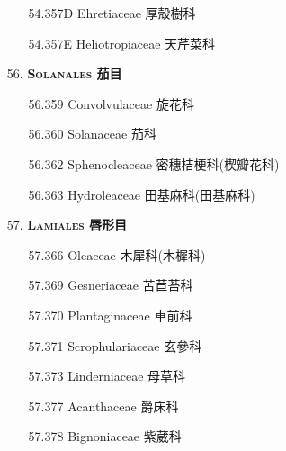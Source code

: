 \begin{enumerate}
\begin{enumerate}
        
      \item[54.357D] Ehretiaceae 厚殼樹科     
        
      \item[54.357E] Heliotropiaceae 天芹菜科     
        
    \end{enumerate}
  \item[56. ] \textbf{\textsc{Solanales} 茄目}   
    \begin{enumerate}
      \item[56.359] Convolvulaceae 旋花科     
        
      \item[56.360] Solanaceae 茄科     
        
      \item[56.362] Sphenocleaceae 密穗桔梗科(楔瓣花科)     
        
      \item[56.363] Hydroleaceae 田基麻科(田基麻科)     
        
    \end{enumerate}
  \item[57. ] \textbf{\textsc{Lamiales} 唇形目}   
    \begin{enumerate}
      \item[57.366] Oleaceae 木犀科(木樨科)     
        
      \item[57.369] Gesneriaceae 苦苣苔科     
        
      \item[57.370] Plantaginaceae 車前科     
        
      \item[57.371] Scrophulariaceae 玄參科     
        
      \item[57.373] Linderniaceae 母草科     
        
      \item[57.377] Acanthaceae 爵床科     
        
      \item[57.378] Bignoniaceae 紫葳科     

\end{enumerate}
\end{enumerate}

